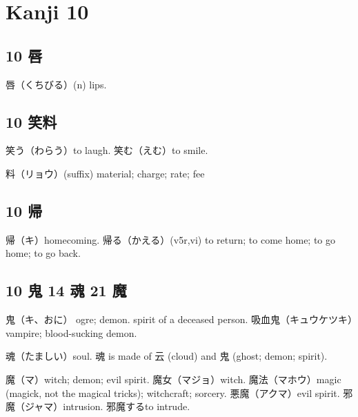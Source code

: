 \chapter{Kanji 10}

\section{10 唇}

唇（くちびる）(n) lips.

\section{10 笑料}

笑う（わらう）to laugh.
笑む（えむ）to smile.

料（リョウ）(suffix) material; charge; rate; fee

\section{10 帰}

帰（キ）homecoming.
帰る（かえる）(v5r,vi)
to return; to come home; to go home; to go back.

\section{10 鬼 14 魂 21 魔}

鬼（キ、おに）
ogre; demon.
spirit of a deceased person.
吸血鬼（キュウケツキ）vampire; blood-sucking demon.

魂（たましい）soul.
魂 is made of 云 (cloud) and 鬼 (ghost; demon; spirit).

魔（マ）witch; demon; evil spirit.
魔女（マジョ）witch.
魔法（マホウ）magic (magick, not the magical tricks); witchcraft; sorcery.
悪魔（アクマ）evil spirit.
邪魔（ジャマ）intrusion.
邪魔するto intrude.
